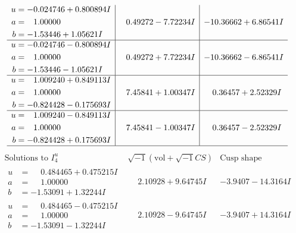 \documentclass[1p]{elsarticle_modified}
\theoremstyle{definition}
\newcommand{\I}{\sqrt{-1}}
\begin{document}
$$\begin{array}{c|c|c}
\begin{aligned}
u &= -0.024746 + 0.800894 I \\
a &= \phantom{-}1.00000\phantom{ +0.000000I} \\
b &= -1.53446 + 1.05621 I\end{aligned}
 & \phantom{-}0.49272 - 7.72234 I & -10.36662 + 6.86541 I \\ \hline\begin{aligned}
u &= -0.024746 - 0.800894 I \\
a &= \phantom{-}1.00000\phantom{ +0.000000I} \\
b &= -1.53446 - 1.05621 I\end{aligned}
 & \phantom{-}0.49272 + 7.72234 I & -10.36662 - 6.86541 I \\ \hline\begin{aligned}
u &= \phantom{-}1.009240 + 0.849113 I \\
a &= \phantom{-}1.00000\phantom{ +0.000000I} \\
b &= -0.824428 - 0.175693 I\end{aligned}
 & \phantom{-}7.45841 + 1.00347 I & \phantom{-}0.36457 + 2.52329 I \\ \hline\begin{aligned}
u &= \phantom{-}1.009240 - 0.849113 I \\
a &= \phantom{-}1.00000\phantom{ +0.000000I} \\
b &= -0.824428 + 0.175693 I\end{aligned}
 & \phantom{-}7.45841 - 1.00347 I & \phantom{-}0.36457 - 2.52329 I\\
 \hline 
 \end{array}$$\newpage$$\begin{array}{c|c|c}  
\text{Solutions to }I^u_{4}& \I (\text{vol} + \sqrt{-1}CS) & \text{Cusp shape}\\
 \hline 
\begin{aligned}
u &= \phantom{-}0.484465 + 0.475215 I \\
a &= \phantom{-}1.00000\phantom{ +0.000000I} \\
b &= -1.53091 + 1.32244 I\end{aligned}
 & \phantom{-}2.10928 + 9.64745 I & -3.9407 - 14.3164 I \\ \hline\begin{aligned}
u &= \phantom{-}0.484465 - 0.475215 I \\
a &= \phantom{-}1.00000\phantom{ +0.000000I} \\
b &= -1.53091 - 1.32244 I\end{aligned}
 & \phantom{-}2.10928 - 9.64745 I & -3.9407 + 14.3164 I \\ \hline\begin{aligned}

\end{aligned}
\end{array}$$
\end{document}

